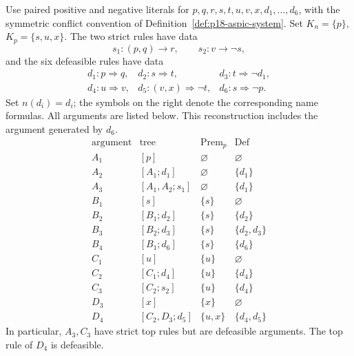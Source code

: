 Use paired positive and negative literals for
\(p,q,r,s,t,u,v,x,d_1,\ldots,d_6\), with the symmetric conflict convention
of Definition~\ref{def:p18-aspic-system}. Set \(K_n=\{p\}\),
\(K_p=\{s,u,x\}\). The two strict rules have data
\[
 s_1:(p,q)\to r,\qquad s_2:v\to\neg s,
\]
and the six defeasible rules have data
\[
\begin{array}{lll}
 d_1:p\Rightarrow q,&d_2:s\Rightarrow t,&d_3:t\Rightarrow\neg d_1,\\
 d_4:u\Rightarrow v,&d_5:(v,x)\Rightarrow\neg t,&
 d_6:s\Rightarrow\neg p .
\end{array}
\]
Set \(n(d_i)=d_i\); the symbols on the right denote the corresponding
name formulas. All arguments are listed below. This reconstruction
includes the argument generated by \(d_6\).
\[
\begin{array}{c|l|c|c}
\text{argument}&\text{tree}&\operatorname{Prem}_p&\operatorname{Def}\\ \hline
A_1&[p]&\varnothing&\varnothing\\
A_2&[A_1;d_1]&\varnothing&\{d_1\}\\
A_3&[A_1,A_2;s_1]&\varnothing&\{d_1\}\\
B_1&[s]&\{s\}&\varnothing\\
B_2&[B_1;d_2]&\{s\}&\{d_2\}\\
B_3&[B_2;d_3]&\{s\}&\{d_2,d_3\}\\
B_4&[B_1;d_6]&\{s\}&\{d_6\}\\
C_1&[u]&\{u\}&\varnothing\\
C_2&[C_1;d_4]&\{u\}&\{d_4\}\\
C_3&[C_2;s_2]&\{u\}&\{d_4\}\\
D_3&[x]&\{x\}&\varnothing\\
D_4&[C_2,D_3;d_5]&\{u,x\}&\{d_4,d_5\}
\end{array}
\]
In particular, \(A_3,C_3\) have strict top rules but are defeasible
arguments. The top rule of \(D_4\) is defeasible.

